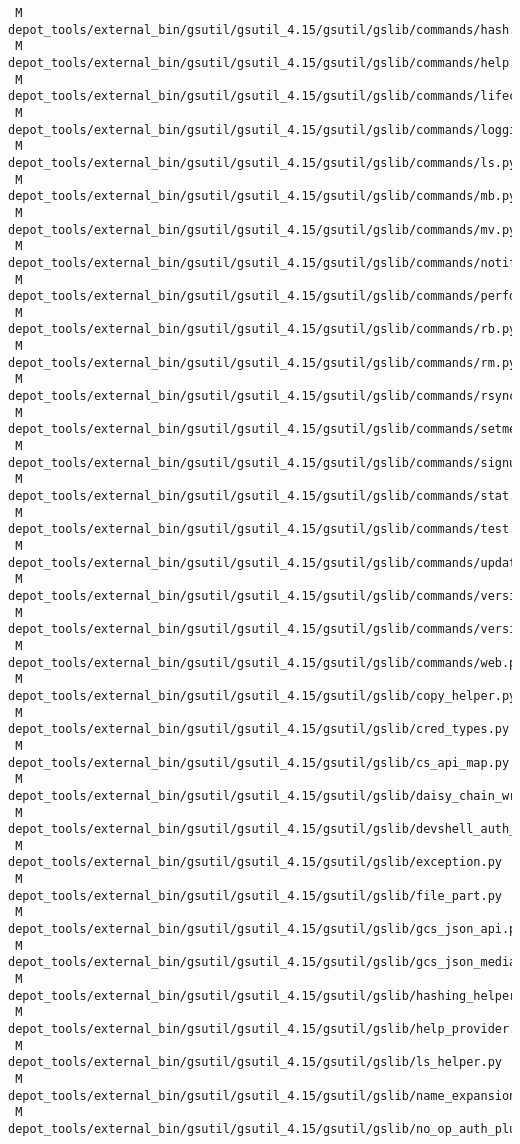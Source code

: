 \documentclass{article}
\begin{document}
\begin{verbatim}
 M depot_tools/external_bin/gsutil/gsutil_4.15/gsutil/gslib/commands/hash.py
 M depot_tools/external_bin/gsutil/gsutil_4.15/gsutil/gslib/commands/help.py
 M depot_tools/external_bin/gsutil/gsutil_4.15/gsutil/gslib/commands/lifecycle.py
 M depot_tools/external_bin/gsutil/gsutil_4.15/gsutil/gslib/commands/logging.py
 M depot_tools/external_bin/gsutil/gsutil_4.15/gsutil/gslib/commands/ls.py
 M depot_tools/external_bin/gsutil/gsutil_4.15/gsutil/gslib/commands/mb.py
 M depot_tools/external_bin/gsutil/gsutil_4.15/gsutil/gslib/commands/mv.py
 M depot_tools/external_bin/gsutil/gsutil_4.15/gsutil/gslib/commands/notification.py
 M depot_tools/external_bin/gsutil/gsutil_4.15/gsutil/gslib/commands/perfdiag.py
 M depot_tools/external_bin/gsutil/gsutil_4.15/gsutil/gslib/commands/rb.py
 M depot_tools/external_bin/gsutil/gsutil_4.15/gsutil/gslib/commands/rm.py
 M depot_tools/external_bin/gsutil/gsutil_4.15/gsutil/gslib/commands/rsync.py
 M depot_tools/external_bin/gsutil/gsutil_4.15/gsutil/gslib/commands/setmeta.py
 M depot_tools/external_bin/gsutil/gsutil_4.15/gsutil/gslib/commands/signurl.py
 M depot_tools/external_bin/gsutil/gsutil_4.15/gsutil/gslib/commands/stat.py
 M depot_tools/external_bin/gsutil/gsutil_4.15/gsutil/gslib/commands/test.py
 M depot_tools/external_bin/gsutil/gsutil_4.15/gsutil/gslib/commands/update.py
 M depot_tools/external_bin/gsutil/gsutil_4.15/gsutil/gslib/commands/version.py
 M depot_tools/external_bin/gsutil/gsutil_4.15/gsutil/gslib/commands/versioning.py
 M depot_tools/external_bin/gsutil/gsutil_4.15/gsutil/gslib/commands/web.py
 M depot_tools/external_bin/gsutil/gsutil_4.15/gsutil/gslib/copy_helper.py
 M depot_tools/external_bin/gsutil/gsutil_4.15/gsutil/gslib/cred_types.py
 M depot_tools/external_bin/gsutil/gsutil_4.15/gsutil/gslib/cs_api_map.py
 M depot_tools/external_bin/gsutil/gsutil_4.15/gsutil/gslib/daisy_chain_wrapper.py
 M depot_tools/external_bin/gsutil/gsutil_4.15/gsutil/gslib/devshell_auth_plugin.py
 M depot_tools/external_bin/gsutil/gsutil_4.15/gsutil/gslib/exception.py
 M depot_tools/external_bin/gsutil/gsutil_4.15/gsutil/gslib/file_part.py
 M depot_tools/external_bin/gsutil/gsutil_4.15/gsutil/gslib/gcs_json_api.py
 M depot_tools/external_bin/gsutil/gsutil_4.15/gsutil/gslib/gcs_json_media.py
 M depot_tools/external_bin/gsutil/gsutil_4.15/gsutil/gslib/hashing_helper.py
 M depot_tools/external_bin/gsutil/gsutil_4.15/gsutil/gslib/help_provider.py
 M depot_tools/external_bin/gsutil/gsutil_4.15/gsutil/gslib/ls_helper.py
 M depot_tools/external_bin/gsutil/gsutil_4.15/gsutil/gslib/name_expansion.py
 M depot_tools/external_bin/gsutil/gsutil_4.15/gsutil/gslib/no_op_auth_plugin.py

\end{verbatim}
\end{document}
